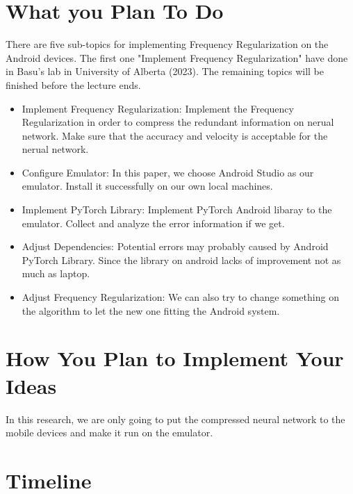 \documentclass{article}
\begin{document}
\section*{What you Plan To Do}
There are five sub-topics for implementing Frequency Regularization on the Android devices. The first one "Implement Frequency Regularization" have done in Basu's lab in University of Alberta (2023). The remaining topics will be finished before the lecture ends.


\begin{itemize}
	\item Implement Frequency Regularization: Implement the Frequency Regularization in order to compress the redundant information on nerual network. Make sure that the accuracy and velocity is acceptable for the nerual network.
	
	\item Configure Emulator: In this paper, we choose Android Studio as our emulator. Install it successfully on our own local machines.
	
	\item Implement PyTorch Library: Implement PyTorch Android libaray to the emulator. Collect and analyze the error information if we get.
	
	\item Adjust Dependencies: Potential errors may probably caused by Android PyTorch Library. Since the library on android lacks of improvement not as much as laptop.
	
	\item Adjust Frequency Regularization: We can also try to change something on the algorithm to let the new one fitting the Android system.
	
\end{itemize}

\section*{How You Plan to Implement Your Ideas}

In this research, we are only going to put the compressed neural network to the mobile devices and make it run on the emulator. 



\section*{Timeline}
\end{document}
